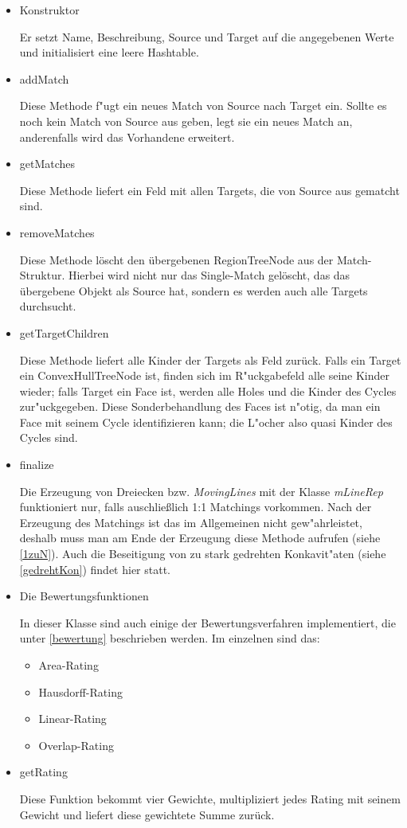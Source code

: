 \begin{itemize}

\item Konstruktor

Er setzt Name, Beschreibung, Source und Target auf die angegebenen Werte und initialisiert eine leere Hashtable.

\item addMatch

Diese Methode f"ugt ein neues Match von Source nach Target ein. Sollte es noch kein Match von Source aus geben, legt sie ein neues Match an, anderenfalls wird  das Vorhandene erweitert.

\item getMatches

Diese Methode liefert ein Feld mit allen Targets, die von Source aus gematcht sind.

\item removeMatches

Diese Methode löscht den übergebenen RegionTreeNode aus der Match-Struktur. Hierbei wird nicht nur das Single-Match gelöscht, das das übergebene Objekt als Source hat, sondern es werden auch alle Targets durchsucht.

\item getTargetChildren

Diese Methode liefert alle Kinder der Targets als Feld zurück. Falls ein Target ein ConvexHullTreeNode ist, finden sich im R"uckgabefeld alle seine Kinder  wieder; falls Target ein Face ist, werden alle Holes und die Kinder des Cycles zur"uckgegeben. Diese Sonderbehandlung des Faces ist n"otig, da man ein Face mit seinem Cycle identifizieren kann; die L"ocher also quasi Kinder des Cycles sind.

\item finalize

Die Erzeugung von Dreiecken bzw. \textit{MovingLines} mit der Klasse \textit{mLineRep} funktioniert nur, falls auschließlich 1:1 Matchings vorkommen. Nach der Erzeugung des Matchings ist das im Allgemeinen nicht gew"ahrleistet, deshalb muss man am Ende der Erzeugung diese Methode aufrufen  (siehe \vref{1zuN}). Auch die Beseitigung von zu stark gedrehten Konkavit"aten (siehe \vref{gedrehtKon}) findet hier statt.

\item Die Bewertungsfunktionen

In dieser Klasse sind auch einige der Bewertungsverfahren implementiert, die unter \vref{bewertung} beschrieben werden. Im einzelnen sind das:
\begin{itemize}
\item  Area-Rating
\item  Hausdorff-Rating
\item  Linear-Rating
\item  Overlap-Rating
\end{itemize}

\item getRating

Diese Funktion bekommt vier Gewichte, multipliziert jedes Rating mit seinem Gewicht und liefert diese gewichtete Summe zurück.

\end{itemize}



